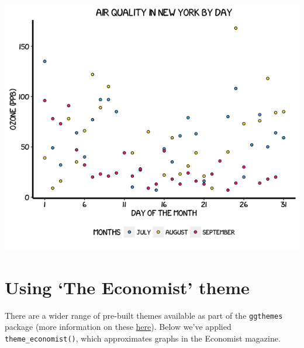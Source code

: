 \begin{center}\includegraphics[width=0.55\linewidth]{0_all_posts_pdf/scatter_13-1} \end{center}

\section{\texorpdfstring{Using `The Economist'
theme}{Using The Economist theme}}\label{using-the-economist-theme-4}

There are a wider range of pre-built themes available as part of the
\texttt{ggthemes} package (more information on these
\href{https://cran.r-project.org/web/packages/ggthemes/vignettes/ggthemes.html}{here}).
Below we've applied \texttt{theme\_economist()}, which approximates
graphs in the Economist magazine.

